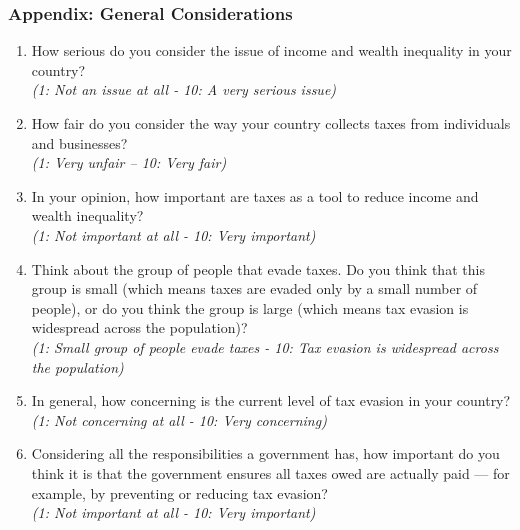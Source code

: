 \documentclass{beamer}
\begin{document}
\begin{frame}[allowframebreaks]
\label{General_Considerations_Appendix}
\frametitle{Appendix: General Considerations}
\footnotesize
\begin{enumerate}
    \item How serious do you consider the issue of income and wealth inequality in your country?\\
    \textit{(1: Not an issue at all - 10: A very serious issue)}
    \item How fair do you consider the way your country collects taxes from individuals and businesses?\\
    \textit{(1: Very unfair – 10: Very fair)}
    \item In your opinion, how important are taxes as a tool to reduce income and wealth inequality?\\
    \textit{(1: Not important at all - 10: Very important)}
    \item Think about the group of people that evade taxes. Do you think that this group is small (which means taxes are evaded only by a small number of people), or do you think the group is large (which means tax evasion is widespread across the population)?\\
    \textit{(1: Small group of people evade taxes - 10: Tax evasion is widespread across the population)}
    \item In general, how concerning is the current level of tax evasion in your country?\\
    \textit{(1: Not concerning at all - 10: Very concerning)}
    \item Considering all the responsibilities a government has, how important do you think it is that the government ensures all taxes owed are actually paid — for example, by preventing or reducing tax evasion?\\
    \textit{(1: Not important at all  - 10: Very important)}
\end{enumerate}


\end{frame}
\end{document}
